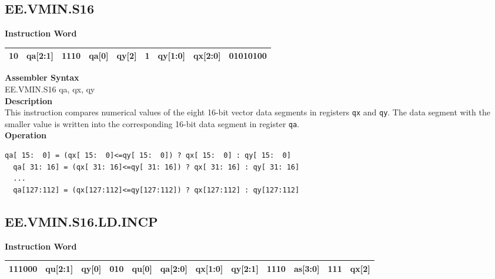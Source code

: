 \clearpage
\subsection{EE.VMIN.S16}\label{instruction:EEVMINS16}
\setlength\tabcolsep{6pt}
\textbf{Instruction Word} \\
\begin{tabular}{|c|c|c|c|c|c|c|c|c|}
	\hline
	10 & qa[2:1] & 1110 & qa[0] & qy[2] & 1 & qy[1:0] & qx[2:0] & 01010100 \\
	\hline
\end{tabular}

\textbf{Assembler Syntax} \\
EE.VMIN.S16 qa, qx, qy \\
\textbf{Description} \\
This instruction compares numerical values of the eight 16-bit vector data segments in registers \lstinline{qx} and \lstinline{qy}. The data segment with the smaller value is written into the corresponding 16-bit data segment in register \lstinline{qa}.\\
\textbf{Operation}
\begin{lstlisting}[escapeinside=`?]
  qa[ 15:  0] = (qx[ 15:  0]<=qy[ 15:  0]) ? qx[ 15:  0] : qy[ 15:  0]
  qa[ 31: 16] = (qx[ 31: 16]<=qy[ 31: 16]) ? qx[ 31: 16] : qy[ 31: 16]
  ...
  qa[127:112] = (qx[127:112]<=qy[127:112]) ? qx[127:112] : qy[127:112]
\end{lstlisting}

\clearpage
\subsection{EE.VMIN.S16.LD.INCP}\label{instruction:EEVMINS16LDINCP}
\setlength\tabcolsep{6pt}
\textbf{Instruction Word} \\
\begin{tabular}{|c|c|c|c|c|c|c|c|c|c|c|c|}
	\hline
	111000 & qu[2:1] & qy[0] & 010 & qu[0] & qa[2:0] & qx[1:0] & qy[2:1] & 1110 & as[3:0] & 111 & qx[2] \\
	\hline
\end{tabular}

